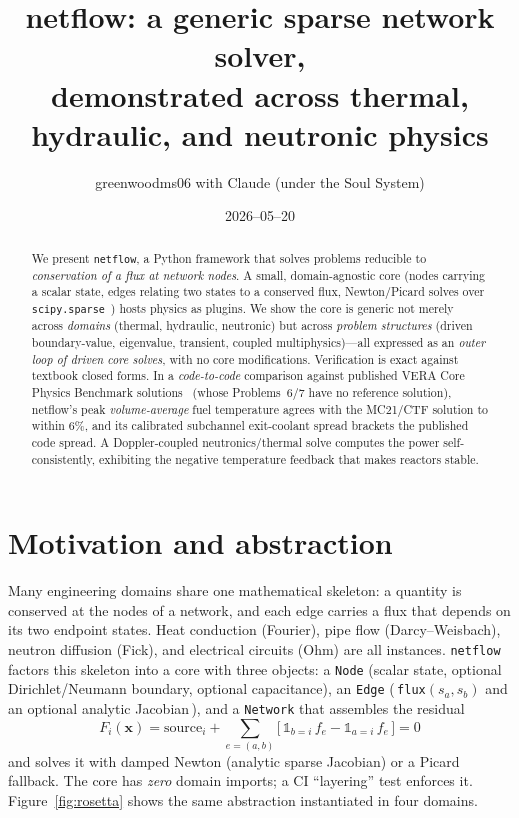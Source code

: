 \documentclass[10pt,twocolumn]{article}
\title{\vspace{-3em}\textbf{netflow}: a generic sparse network solver,\\
demonstrated across thermal, hydraulic, and neutronic physics}
\author{\small greenwoodms06 \quad with Claude (under the Soul System)}
\date{\small 2026--05--20}
\begin{document}
\maketitle

\begin{abstract}
\small
We present \texttt{netflow}, a Python framework that solves problems
reducible to \emph{conservation of a flux at network nodes}. A small,
domain-agnostic core (nodes carrying a scalar state, edges relating two
states to a conserved flux, Newton/Picard solves over
\texttt{scipy.sparse}~\cite{scipy}) hosts physics as plugins. We show the
core is generic not merely across \emph{domains} (thermal, hydraulic,
neutronic) but across \emph{problem structures} (driven boundary-value,
eigenvalue, transient, coupled multiphysics)---all expressed as an
\emph{outer loop of driven core solves}, with no core modifications.
Verification is exact against textbook closed forms. In a \emph{code-to-code}
comparison against published VERA Core Physics Benchmark
solutions~\cite{vera,kelly} (whose Problems~6/7 have no reference
solution), netflow's peak \emph{volume-average} fuel temperature agrees
with the MC21/CTF solution to within 6\%, and its calibrated subchannel
exit-coolant spread brackets the published code spread. A Doppler-coupled
neutronics/thermal solve computes the power self-consistently, exhibiting
the negative temperature feedback that makes reactors stable.
\end{abstract}

\section{Motivation and abstraction}
Many engineering domains share one mathematical skeleton: a quantity is
conserved at the nodes of a network, and each edge carries a flux that
depends on its two endpoint states. Heat conduction (Fourier), pipe flow
(Darcy--Weisbach), neutron diffusion (Fick), and electrical circuits
(Ohm) are all instances. \texttt{netflow} factors this skeleton into a
core with three objects: a \texttt{Node} (scalar state, optional
Dirichlet/Neumann boundary, optional capacitance), an \texttt{Edge}
(\,\texttt{flux}$(s_a,s_b)$ and an optional analytic Jacobian\,), and a
\texttt{Network} that assembles the residual
\begin{equation}
F_i(\mathbf{x}) = \text{source}_i + \!\!\sum_{e=(a,b)}\!\! \big[\,
\mathbb{1}_{b=i}\,f_e - \mathbb{1}_{a=i}\,f_e \,\big] = 0
\end{equation}
and solves it with damped Newton (analytic sparse Jacobian) or a Picard
fallback. The core has \emph{zero} domain imports; a CI ``layering''
test enforces it. Figure~\ref{fig:rosetta} shows the same abstraction
instantiated in four domains.
\end{document}
